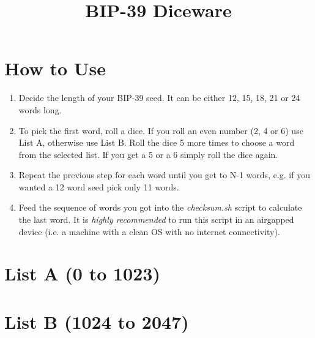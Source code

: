 \documentclass{article}
\title{BIP-39 Diceware}
\author{}
\date{}
\begin{document}
\maketitle

\section*{How to Use}

\begin{enumerate}
\item Decide the length of your BIP-39 seed. It can be either 12, 15, 18, 21 or 24 words long.
\item To pick the first word, roll a dice. If you roll an even number (2, 4 or 6) use List A, otherwise use List B.
Roll the dice 5 more times to choose a word from the selected list. If you get a 5 or a 6 simply roll the dice again.
\item Repeat the previous step for each word until you get to N-1 words, e.g. if you wanted a 12 word seed pick only 11 words.
\item Feed the sequence of words you got into the \emph{checksum.sh} script to calculate the last word.
It is \emph{highly recommended} to run this script in an airgapped device (i.e. a machine with a clean OS with no internet connectivity).
\end{enumerate}

\section*{List A (0 to 1023)}
\begin{multicols}{4}

\end{multicols}

\clearpage

\section*{List B (1024 to 2047)}
\begin{multicols}{4}

\end{multicols}
\end{document}
